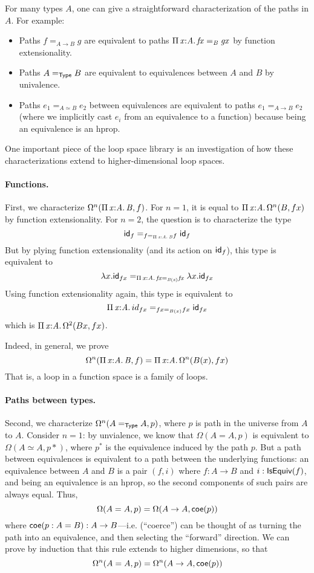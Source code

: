 For many types $A$, one can give a straightforward characterization of
the paths in $A$.  For example:
\begin{itemize}
\item Paths $f =_{A \to B} g$ are equivalent
to paths $\textnormal{$\Pi$}\,\mathit{x} \mathit{:} \mathit{A}.\,\mathit{f x =_B g x}$ by function extensionality.
\item Paths $A
=_{\mathsf{Type}} B$ are equivalent to equivalences between $A$ and $B$ by
univalence.
\item Paths $e_1 =_{A \simeq B} e_2$ between equivalences are equivalent
  to paths $e_1 =_{A \to B} e_2$ (where we implicitly cast $e_i$ from an
  equivalence to a function) because being an equivalence is an hprop.
\end{itemize}

One important piece of the loop space library is an investigation of how
these characterizations extend to higher-dimensional loop spaces.

\paragraph{Functions.}

First, we characterize $\Omega^n(\textnormal{$\Pi$}\,\mathit{x} \mathit{:} \mathit{A}.\,\mathit{B},f)$.  For $n=1$, it is
equal to $\textnormal{$\Pi$}\,\mathit{x} \mathit{:} \mathit{A}.\,\mathit{} \Omega^n(B, f x)$ by function extensionality.
For $n = 2$, the question is to characterize the type
\[
\mathsf{id}_f =_{f =_{\textnormal{$\Pi$}\,\mathit{x} \mathit{:} \mathit{A}.\,\mathit{B}} f} \mathsf{id}_f
\]
But by plying function extensionality (and its action on $\mathsf{id}_f$), this type
is equivalent to
\[
\lambda x. \mathsf{id}_{f x} =_{\textnormal{$\Pi$}\,\mathit{x} \mathit{:} \mathit{A}.\,\mathit{f x =_{B(x)} f x}} \lambda x. \mathsf{id}_{f x}
\]
Using function extensionality again, this type is equivalent to
\[
\picl{x}{A} \dsd{id}_{f x} =_{f x =_{B(x)} f x} \dsd{id}_{f x}
\]
which is $\textnormal{$\Pi$}\,\mathit{x} \mathit{:} \mathit{A}.\,\mathit{}\Omega^2(B x, f x)$.  

Indeed, in general, we prove
\[
\Omega^n(\textnormal{$\Pi$}\,\mathit{x} \mathit{:} \mathit{A}.\,\mathit{B},f) = \textnormal{$\Pi$}\,\mathit{x} \mathit{:} \mathit{A}.\,\mathit{}\Omega^n(B(x),f x) 
\]
That is, a loop in a function space is a family of loops.  

\paragraph{Paths between types.}

Second, we characterize $\Omega^n(A =_{\mathsf{Type}} A, p)$, where $p$ is
path in the universe from $A$ to $A$.  Consider $n = 1$: by unvialence,
we know that $\Omega(A = A , p)$ is equivalent to $\Omega(A \simeq A, p*)$,
where $p^*$ is the equivalence induced by the path $p$.  But a path
between equivalences is equivalent to a path between the underlying
functions: an equivalence between $A$ and $B$ is a pair $(f , i)$ where
$f : A \to B$ and $i : \mathsf{IsEquiv}(f)$, and being an equivalence is an
hprop, so the second components of such pairs are always equal.  Thus, 
\[
\Omega(A = A , p) = \Omega(A \to A, \mathsf{coe}(p))
\]
where $\mathsf{coe}(p : A = B) : A \to B$---i.e.  (``coerce'') can be thought
of as turning the path into an equivalence, and then selecting the
``forward'' direction.  We can prove by induction that this rule extends
to higher dimensions, so that 
\[
\Omega^n(A = A , p) = \Omega^n(A \to A, \mathsf{coe}(p))
\]

